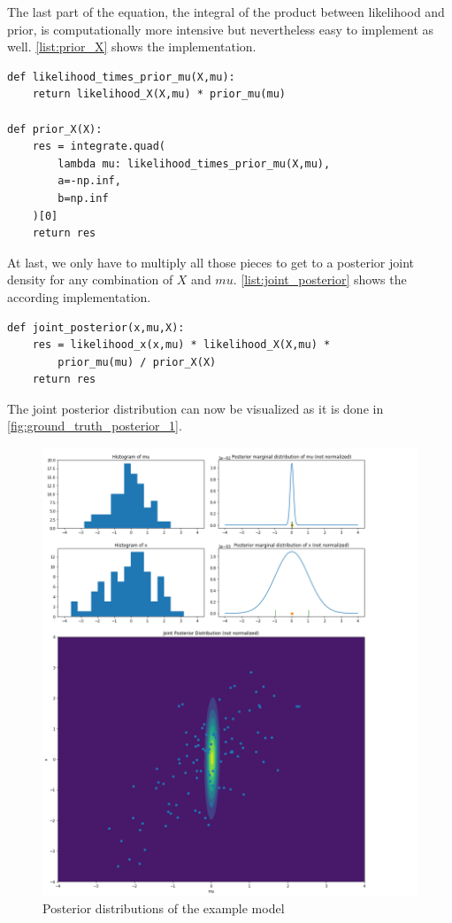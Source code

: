 \documentclass{article}
\begin{document}
The last part of the equation, the integral of the product between likelihood and prior, is computationally more intensive but nevertheless easy to implement as well. \autoref{list:prior_X} shows the implementation.
\begin{lstlisting}[caption={Implementation of the prior for X}, label={list:prior_X},captionpos=b]
def likelihood_times_prior_mu(X,mu):
    return likelihood_X(X,mu) * prior_mu(mu)
	
def prior_X(X):
    res = integrate.quad(
        lambda mu: likelihood_times_prior_mu(X,mu),
        a=-np.inf,
        b=np.inf
    )[0]
    return res
\end{lstlisting}
At last, we only have to multiply all those pieces to get to a posterior joint density for any combination of $X$ and $mu$. \autoref{list:joint_posterior} shows the according implementation.\\
\begin{minipage}{\linewidth}
\begin{lstlisting}[caption={Implementation of the joint posterior distribution}, label={list:joint_posterior},captionpos=b]
def joint_posterior(x,mu,X):
    res = likelihood_x(x,mu) * likelihood_X(X,mu) * 
        prior_mu(mu) / prior_X(X)
    return res
\end{lstlisting}
\end{minipage}
The joint posterior distribution can now be visualized as it is done in \autoref{fig:ground_truth_posterior_1}.
\begin{figure}
	\includegraphics[width=\textwidth]{images/ground_truth_posterior_1_cut.png}
	\caption[Posterior distributions of the example model]{Posterior distributions of the example model}
	\label{fig:ground_truth_posterior_1}
\end{figure}
\end{document}
